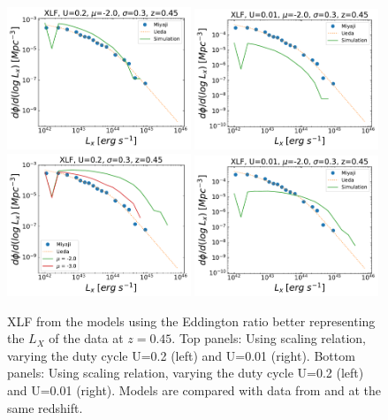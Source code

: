 \begin{figure}
	\includegraphics[width=0.49\textwidth]{Figs/Chapter3/XLF_z0.45_mean-2.00_sigma0.30_const0.2.pdf}
	\includegraphics[width=0.49\textwidth]{Figs/Chapter3/XLF_z0.45_mean-2.00_sigma0.30_const0.01.pdf}
	\includegraphics[width=0.49\textwidth]{Figs/Chapter3/XLF_z0.45_sigma0.3mean_Sahu19_const0.2.pdf}
	\includegraphics[width=0.49\textwidth]{Figs/Chapter3/XLF_z0.45_mean-2.00_sigma0.30Sahu19_const0.01.pdf}
	\caption{XLF from the models using the Eddington ratio better representing the $L_X$ of the data at $z=0.45$. Top panels: Using \citet{2015ApJ...813...82R} scaling relation, varying the duty cycle U=0.2 (left) and U=0.01 (right). Bottom panels: Using \citet{2019ApJ...876..155S} scaling relation, varying the duty cycle U=0.2 (left) and U=0.01 (right). Models are compared with data from \citet{2014ApJ...786..104U} and \citet{2015ApJ...804..104M} at the same redshift.}
	\label{fig:XLF}
\end{figure}

